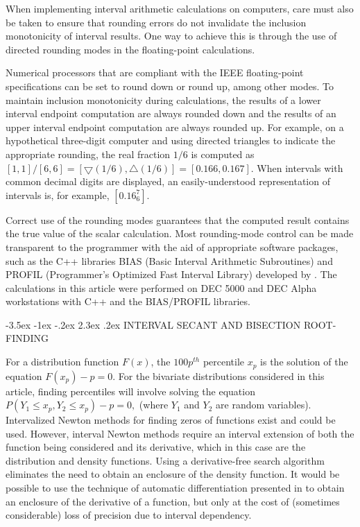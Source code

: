 \documentclass[10pt,letterpaper]{article}
\makeatletter
\renewcommand\section{\@startsection {section}{1}{\z@}%
                 {-3.5ex \@plus -1ex \@minus -.2ex}%
                 {2.3ex \@plus.2ex}%
                 {\normalfont\normalsize\bfseries }}
\makeatother
\begin{document}
When implementing interval arithmetic calculations on computers, care must
also be taken to ensure that rounding errors do not invalidate the 
inclusion monotonicity
of interval results.  One way to achieve this is through the
use of directed rounding modes in the floating-point calculations.  

Numerical processors that are compliant with the IEEE floating-point
specifications \citep{ANSI87}
can be set to round down or round up, among other modes.  To
maintain inclusion monotonicity during calculations, 
the results of a lower interval 
endpoint computation
are always rounded down and the results of an upper interval 
endpoint computation are
always rounded up.  For example, on a hypothetical three-digit computer and
using directed triangles to indicate the appropriate rounding, the
real fraction $1/6$ is computed as 
$[1,1]/[6,6] = [\bigtriangledown(1/6) , \bigtriangleup(1/6)] = [0.166,0.167]$.
When intervals with common decimal digits are displayed, an easily-understood
representation of intervals is, for example, $ [0.16_6^7]$.

Correct use of the rounding modes guarantees that the computed result contains
the true value of the scalar calculation.
Most rounding-mode control can be made transparent to the programmer with the
aid of appropriate software packages, such as the C++ libraries BIAS 
(Basic Interval Arithmetic Subroutines) and PROFIL 
(Programmer's Optimized Fast Interval Library)
developed by \cite{KnuppelBIAS,KnuppelPROFIL}.  
The calculations in this article were performed on DEC 5000 and DEC Alpha
workstations with C++ and the BIAS/PROFIL libraries.

\section{INTERVAL SECANT AND BISECTION ROOT-FINDING\label{sec:root}}

For a distribution function $F(x)$, the $100p^{th}$ percentile $x_p$ is the
solution of the equation 
$F(x_p) - p = 0$.  For the bivariate distributions
considered in this article, finding percentiles will involve solving the
equation $P(Y_1 \leq x_p, Y_2 \leq x_p) - p = 0,$ (where $Y_1$ and $Y_2$ are
random variables).  
Intervalized Newton methods for finding zeros of functions 
exist and could be used.
However, interval Newton methods require 
an interval extension of both the function being considered
and its derivative, which in this
case are the distribution and density functions.  
Using a derivative-free search algorithm
eliminates the need to obtain an enclosure of the density function.
It would be possible to use the 
technique of automatic differentiation presented in 
\cite{Moore79} to obtain an
enclosure of the derivative of a function, but only at the cost of (sometimes
considerable) loss of precision due to interval dependency.
\end{document}
